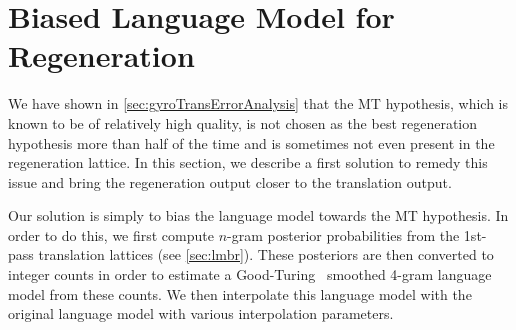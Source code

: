 \section{Biased Language Model for Regeneration}
\label{sec:gyroTransBiasedLm}

We have shown in \autoref{sec:gyroTransErrorAnalysis} that the MT
hypothesis, which is known to
be of relatively high quality, is not chosen as the best regeneration
hypothesis more than half of the time and is sometimes not even
present in the regeneration lattice.
In this section, we describe a first solution to remedy this issue and
bring the regeneration output closer to the translation output.

Our solution is simply to bias the language model towards the MT hypothesis.
In order to do this, we first compute $n$-gram posterior probabilities
from the
1st-pass translation lattices (see \autoref{sec:lmbr}).
These posteriors are then converted
to integer counts in order to estimate a
Good-Turing~\citep{good:1953:biometrika,chen-goodman:1998:harvard} smoothed 4-gram %
language model from these counts.
We then interpolate this language model with the original language model with
various interpolation parameters.

